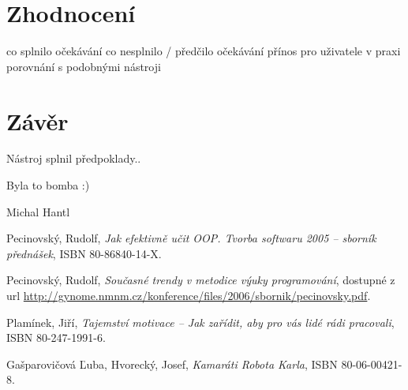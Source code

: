 \documentclass[bc,female,java,dept456]{diploma}						%
\begin{document}
\section{Zhodnocení}
co splnilo očekávání
co nesplnilo / předčilo očekávání
přínos pro uživatele v praxi
porovnání s podobnými nástroji




\section{Závěr}
\label{sec:Conclusion}

Nástroj splnil předpoklady..

Byla to bomba :)

\bigskip
\begin{flushright}
Michal Hantl
\end{flushright}









\begin{thebibliography}{99}


 Pecinovský, Rudolf,
\textit{Jak efektivně učit OOP. Tvorba softwaru 2005 – sborník přednášek}, ISBN 80-86840-14-X.

 Pecinovský, Rudolf,
\textit{Současné trendy v metodice výuky programování}, dostupné z url \url{http://gynome.nmnm.cz/konference/files/2006/sbornik/pecinovsky.pdf}.

 Plamínek, Jiří,
\textit{Tajemství motivace – Jak zařídit, aby pro vás lidé rádi pracovali}, ISBN 80-247-1991-6.

 Gašparovičová Ľuba, Hvorecký, Josef,
\textit{Kamaráti Robota Karla}, ISBN 80-06-00421-8.

\end{thebibliography}


\end{document}
